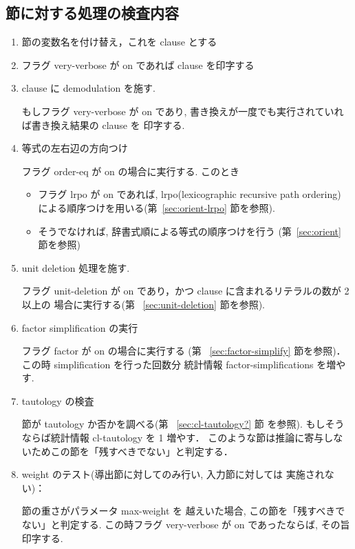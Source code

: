 \subsection{節に対する処理の検査内容}
\label{sec:proc-gen}

\begin{enumerate}
\item 節の変数名を付け替え，これを clause とする
\item フラグ very-verbose が on であれば clause を印字する
\item clause に demodulation を施す.

  もしフラグ very-verbose が on 
  であり, 書き換えが一度でも実行されていれば書き換え結果の clause を
  印字する.

\item 等式の左右辺の方向つけ

  フラグ order-eq が on の場合に実行する.
  このとき
  \begin{itemize}
  \item フラグ lrpo が on であれば, lrpo(lexicographic recursive path ordering)
    による順序つけを用いる(第~\ref{sec:orient-lrpo} 節を参照).
  \item そうでなければ, 辞書式順による等式の順序つけを行う
    (第~\ref{sec:orient} 節を参照)
  \end{itemize}
\item unit deletion 処理を施す.

  フラグ unit-deletion が on であり，かつ
  clause に含まれるリテラルの数が 2 以上の
  場合に実行する(第 ~\ref{sec:unit-deletion} 節を参照).
    
\item  factor simplification の実行

  フラグ factor が on の場合に実行する
  (第 ~\ref{sec:factor-simplify} 節を参照)．
  この時 simplification を行った回数分
  統計情報 factor-simplifications を増やす.

\item tautology の検査

  節が tautology か否かを調べる(第 ~\ref{sec:cl-tautology?} 節
  を参照). もしそうならば統計情報 cl-tautology を 1 増やす．
  このような節は推論に寄与しないためこの節を「残すべきでない」と判定する．

\item weight のテスト(導出節に対してのみ行い, 入力節に対しては
  実施されない)：
    
  節の重さがパラメータ max-weight を
  越えいた場合, この節を「残すべきでない」と判定する.
  この時フラグ very-verbose が on であったならば, その旨印字する.


\end{enumerate}
